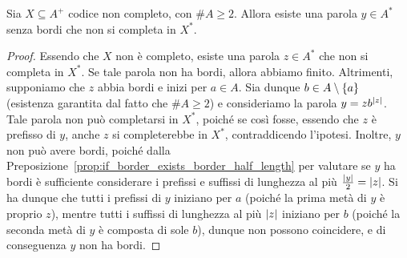 \begin{lemma}[CUSTOM]
  Sia \(X \subseteq A^+\) codice non completo, con \(\# A \geq 2\).
  Allora esiste una parola \(y \in A^*\) senza bordi che non si completa in \(X^*\).
\end{lemma}
\begin{proof}
  Essendo che \(X\) non è completo, esiste una parola \(z \in A^*\) che non si completa in \(X^*\).
  Se tale parola non ha bordi, allora abbiamo finito.
  Altrimenti, supponiamo che \(z\) abbia bordi e inizi per \(a \in A\).
  Sia dunque \(b \in A\setminus\set{a}\) (esistenza garantita dal fatto che \(\# A \geq 2\)) e consideriamo la parola \(y = zb^{\left|z\right|}\).
  Tale parola non può completarsi in \(X^*\), poiché se così fosse, essendo che \(z\) è prefisso di \(y\), anche \(z\) si completerebbe in \(X^*\), contraddicendo l'ipotesi.
  Inoltre, \(y\) non può avere bordi, poiché dalla Preposizione~\ref{prop:if_border_exists_border_half_length} per valutare se \(y\) ha bordi è sufficiente considerare i prefissi e suffissi di lunghezza al più \(\frac{\left|y\right|}{2} = \left|z\right|\).
  Si ha dunque che tutti i prefissi di \(y\) iniziano per \(a\) (poiché la prima metà di \(y\) è proprio \(z\)), mentre tutti i suffissi di lunghezza al più \(\left|z\right|\) iniziano per \(b\) (poiché la seconda metà di \(y\) è composta di sole \(b\)), dunque non possono coincidere, e di conseguenza \(y\) non ha bordi.
\end{proof}

